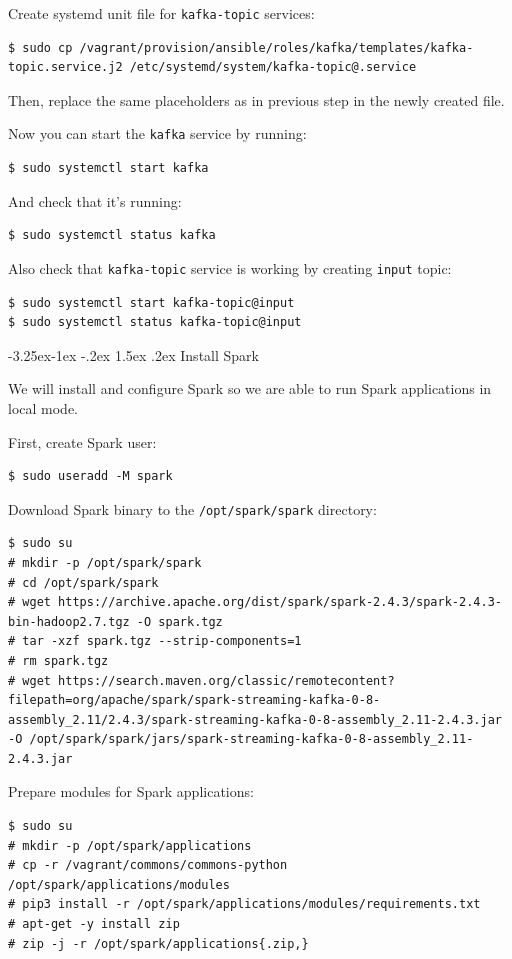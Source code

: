\documentclass[a4paper]{article} %
\makeatletter
\renewcommand{\normalsize}{\fontsize{12}{15}\selectfont\color{textcolor}}
\renewcommand\subsubsection{\@startsection{subsubsection}{3}{\z@}%
                   {-3.25ex\@plus -1ex \@minus -.2ex}%
                   {1.5ex \@plus .2ex}%
                   {\normalfont\sffamily\normalsize\bfseries\color{projectcolor}}}
\makeatother
\begin{document}
Create systemd unit file for \texttt{kafka-topic} services:
\begin{lstlisting}
$ sudo cp /vagrant/provision/ansible/roles/kafka/templates/kafka-topic.service.j2 /etc/systemd/system/kafka-topic@.service
\end{lstlisting}
Then, replace the same placeholders as in previous step in the newly created file.

Now you can start the \texttt{kafka} service by running:
\begin{lstlisting}
$ sudo systemctl start kafka
\end{lstlisting}

And check that it's running:
\begin{lstlisting}
$ sudo systemctl status kafka
\end{lstlisting}

Also check that \texttt{kafka-topic} service is working by creating \texttt{input} topic:
\begin{lstlisting}
$ sudo systemctl start kafka-topic@input
$ sudo systemctl status kafka-topic@input
\end{lstlisting}


\subsubsection{Install Spark}

We will install and configure Spark so we are able to run Spark applications in local mode.

First, create Spark user:
\begin{lstlisting}
$ sudo useradd -M spark
\end{lstlisting}

Download Spark binary to the \texttt{/opt/spark/spark} directory:
\begin{lstlisting}
$ sudo su
# mkdir -p /opt/spark/spark
# cd /opt/spark/spark
# wget https://archive.apache.org/dist/spark/spark-2.4.3/spark-2.4.3-bin-hadoop2.7.tgz -O spark.tgz
# tar -xzf spark.tgz --strip-components=1
# rm spark.tgz
# wget https://search.maven.org/classic/remotecontent?filepath=org/apache/spark/spark-streaming-kafka-0-8-assembly_2.11/2.4.3/spark-streaming-kafka-0-8-assembly_2.11-2.4.3.jar -O /opt/spark/spark/jars/spark-streaming-kafka-0-8-assembly_2.11-2.4.3.jar
\end{lstlisting}

Prepare modules for Spark applications:
\begin{lstlisting}
$ sudo su
# mkdir -p /opt/spark/applications
# cp -r /vagrant/commons/commons-python /opt/spark/applications/modules
# pip3 install -r /opt/spark/applications/modules/requirements.txt
# apt-get -y install zip
# zip -j -r /opt/spark/applications{.zip,}
\end{lstlisting}
\end{document}
